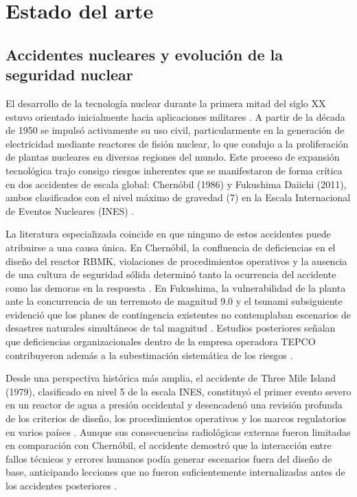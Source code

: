\section{Estado del arte}

\subsection{Accidentes nucleares y evolución de la seguridad nuclear}

El desarrollo de la tecnología nuclear durante la primera mitad del siglo XX estuvo
orientado inicialmente hacia aplicaciones militares \cite{Todeschini}. A partir de
la década de 1950 se impulsó activamente su uso civil, particularmente en la
generación de electricidad mediante reactores de fisión nuclear, lo que condujo a
la proliferación de plantas nucleares en diversas regiones del mundo. Este proceso
de expansión tecnológica trajo consigo riesgos inherentes que se manifestaron de
forma crítica en dos accidentes de escala global: Chernóbil (1986) y Fukushima
Daiichi (2011), ambos clasificados con el nivel máximo de gravedad (7) en la Escala
Internacional de Eventos Nucleares (INES) \cite{IAEAGSG152022}.

La literatura especializada coincide en que ninguno de estos accidentes puede
atribuirse a una causa única. En Chernóbil, la confluencia de deficiencias en el
diseño del reactor RBMK, violaciones de procedimientos operativos y la ausencia
de una cultura de seguridad sólida determinó tanto la ocurrencia del accidente
como las demoras en la respuesta \cite{Shlyakhter, Wakeford}. En Fukushima, la
vulnerabilidad de la planta ante la concurrencia de un terremoto de magnitud 9.0
y el tsunami subsiguiente evidenció que los planes de contingencia existentes no
contemplaban escenarios de desastres naturales simultáneos de tal magnitud
\cite{Durovic}. Estudios posteriores señalan que deficiencias organizacionales
dentro de la empresa operadora TEPCO contribuyeron además a la subestimación
sistemática de los riesgos \cite{Suzuki2014}.

Desde una perspectiva histórica más amplia, el accidente de Three Mile Island
(1979), clasificado en nivel 5 de la escala INES, constituyó el primer evento
severo en un reactor de agua a presión occidental y desencadenó una revisión
profunda de los criterios de diseño, los procedimientos operativos y los marcos
regulatorios en varios países \cite{Walker2004}. Aunque sus consecuencias
radiológicas externas fueron limitadas en comparación con Chernóbil, el accidente
demostró que la interacción entre fallos técnicos y errores humanos podía generar
escenarios fuera del diseño de base, anticipando lecciones que no fueron
suficientemente internalizadas antes de los accidentes posteriores \cite{Walker2004}.

